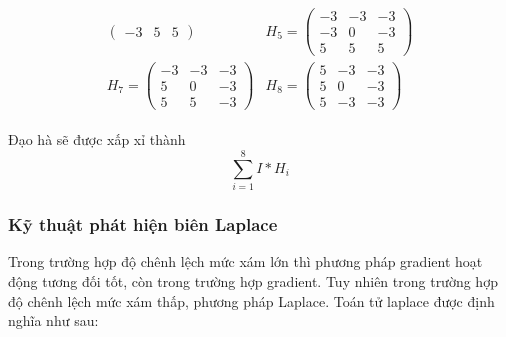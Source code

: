 \documentclass[12pt,oneside,a4]{report}
\begin{document}
\begin{itemize}
\begin{align*}
\begin{matrix}
\begin{pmatrix}
        -3 & 5 & 5
    \end{pmatrix} & H_5=\begin{pmatrix}
        -3 & -3 & -3 \\
        -3 & 0 & -3  \\
        5 & 5 & 5
    \end{pmatrix}\\
        H_7=\begin{pmatrix}
        -3 & -3 & -3 \\
        5 & 0 & -3  \\
        5 & 5 & -3
    \end{pmatrix} & H_8=\begin{pmatrix}
        5 & -3 & -3 \\
        5 & 0 & -3  \\
        5 & -3 & -3
    \end{pmatrix}
    \end{matrix}
\end{align*}
\end{itemize}
Đạo hà sẽ được xấp xỉ thành $$\sum_{i=1}^{8} I\ast H_i$$
\subsubsection{Kỹ thuật phát hiện biên Laplace }
Trong trường hợp độ chênh lệch mức xám lớn thì phương pháp gradient hoạt động tương đối tốt, còn trong trường hợp gradient. Tuy nhiên trong trường hợp độ chênh lệch mức xám thấp, phương pháp Laplace. Toán tử laplace được định nghĩa như sau:
\end{document}
